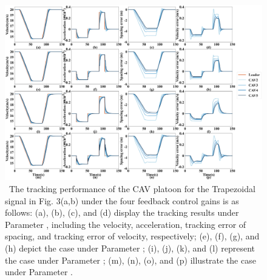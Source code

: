 \documentclass[journal]{IEEEtran}
\begin{document}
\begin{figure}

  \centering
  \includegraphics[width=16cm]{figs/fig4.png}
  \caption{~The tracking performance of the CAV platoon for the Trapezoidal signal in Fig. 3(a,b) under the four feedback control gains is as follows: (a), (b), (c), and (d) display the tracking results under Parameter \uppercase\expandafter{}, including the velocity, acceleration, tracking error of spacing, and tracking error of velocity, respectively; (e), (f), (g), and (h) depict the case under Parameter \uppercase\expandafter{}; (i), (j), (k), and (l) represent the case under Parameter \uppercase\expandafter{}; (m), (n), (o), and (p) illustrate the case under Parameter \uppercase\expandafter{}.}
  \label{fig4}
\end{figure}
\end{document}
